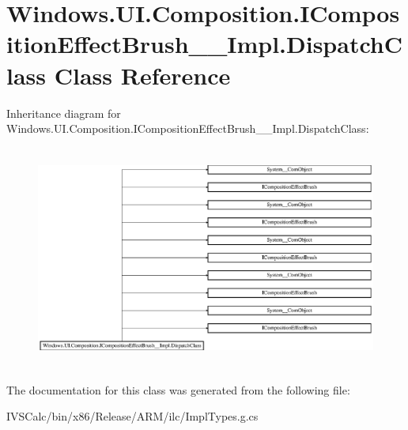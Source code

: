 \hypertarget{class_windows_1_1_u_i_1_1_composition_1_1_i_composition_effect_brush_____impl_1_1_dispatch_class}{}\section{Windows.\+U\+I.\+Composition.\+I\+Composition\+Effect\+Brush\+\_\+\+\_\+\+Impl.\+Dispatch\+Class Class Reference}
\label{class_windows_1_1_u_i_1_1_composition_1_1_i_composition_effect_brush_____impl_1_1_dispatch_class}
Inheritance diagram for Windows.\+U\+I.\+Composition.\+I\+Composition\+Effect\+Brush\+\_\+\+\_\+\+Impl.\+Dispatch\+Class\+:\begin{figure}[H]
\begin{center}
\leavevmode
\includegraphics[height=7.368422cm]{class_windows_1_1_u_i_1_1_composition_1_1_i_composition_effect_brush_____impl_1_1_dispatch_class}
\end{center}
\end{figure}


The documentation for this class was generated from the following file\+:\begin{DoxyCompactItemize}
\item 
I\+V\+S\+Calc/bin/x86/\+Release/\+A\+R\+M/ilc/Impl\+Types.\+g.\+cs\end{DoxyCompactItemize}
